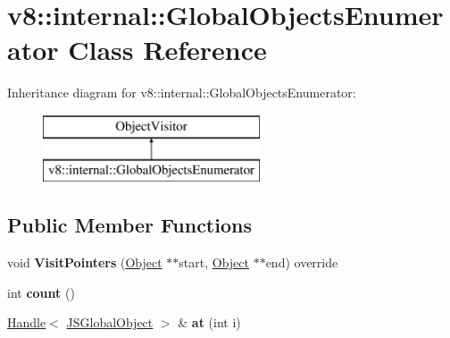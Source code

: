 \hypertarget{classv8_1_1internal_1_1_global_objects_enumerator}{}\section{v8\+:\+:internal\+:\+:Global\+Objects\+Enumerator Class Reference}
\label{classv8_1_1internal_1_1_global_objects_enumerator}
Inheritance diagram for v8\+:\+:internal\+:\+:Global\+Objects\+Enumerator\+:\begin{figure}[H]
\begin{center}
\leavevmode
\includegraphics[height=2.000000cm]{classv8_1_1internal_1_1_global_objects_enumerator}
\end{center}
\end{figure}
\subsection*{Public Member Functions}
\begin{DoxyCompactItemize}
\item 
void {\bfseries Visit\+Pointers} (\hyperlink{classv8_1_1internal_1_1_object}{Object} $\ast$$\ast$start, \hyperlink{classv8_1_1internal_1_1_object}{Object} $\ast$$\ast$end) override\hypertarget{classv8_1_1internal_1_1_global_objects_enumerator_a41b38becae6937ec13d734fef6fb4cdb}{}\label{classv8_1_1internal_1_1_global_objects_enumerator_a41b38becae6937ec13d734fef6fb4cdb}

\item 
int {\bfseries count} ()\hypertarget{classv8_1_1internal_1_1_global_objects_enumerator_a83b8dbd90d400eb5b2d2bd6a53f1b848}{}\label{classv8_1_1internal_1_1_global_objects_enumerator_a83b8dbd90d400eb5b2d2bd6a53f1b848}

\item 
\hyperlink{classv8_1_1internal_1_1_handle}{Handle}$<$ \hyperlink{classv8_1_1internal_1_1_j_s_global_object}{J\+S\+Global\+Object} $>$ \& {\bfseries at} (int i)\hypertarget{classv8_1_1internal_1_1_global_objects_enumerator_a5f6c11e23a0d9d4abe83af8b9abc2ec1}{}\label{classv8_1_1internal_1_1_global_objects_enumerator_a5f6c11e23a0d9d4abe83af8b9abc2ec1}

\end{DoxyCompactItemize}
